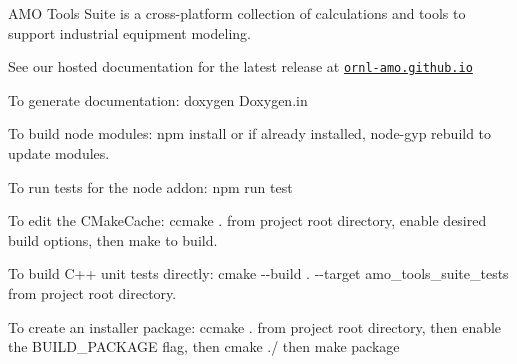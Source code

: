 A\+MO Tools Suite is a cross-\/platform collection of calculations and tools to support industrial equipment modeling.

See our hosted documentation for the latest release at \href{https://ornl-amo.github.io/}{\tt ornl-\/amo.\+github.\+io}

To generate documentation\+: {\ttfamily doxygen Doxygen.\+in}

To build node modules\+: {\ttfamily npm install} or if already installed, {\ttfamily node-\/gyp rebuild} to update modules.

To run tests for the node addon\+: {\ttfamily npm run test}

To edit the C\+Make\+Cache\+: {\ttfamily ccmake .} from project root directory, enable desired build options, then {\ttfamily make} to build.

To build C++ unit tests directly\+: {\ttfamily cmake -\/-\/build . -\/-\/target amo\+\_\+tools\+\_\+suite\+\_\+tests} from project root directory.

To create an installer package\+: {\ttfamily ccmake .} from project root directory, then enable the {\ttfamily B\+U\+I\+L\+D\+\_\+\+P\+A\+C\+K\+A\+GE} flag, then {\ttfamily cmake ./} then {\ttfamily make package} 
